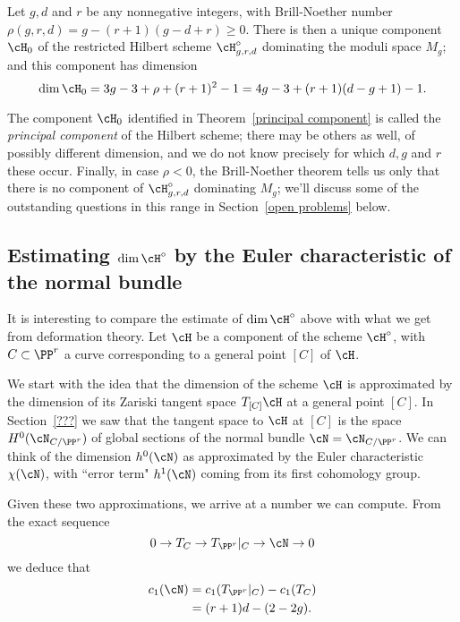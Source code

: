 \begin{theorem}\label{principal component}
Let $g, d$ and $r$ be any nonnegative integers, with Brill-Noether number  $\rho(g,r,d) = g - (r+1)(g-d+r) \geq 0$. There is then a unique component $\cH_0$ of the restricted Hilbert scheme $\cH^\circ_{g,r,d}$ dominating the moduli space $M_g$; and this component has dimension
$$
\dim \cH_0 = 3g-3+\rho + (r+1)^2 - 1 = 4g-3 + (r+1)(d-g+1) - 1.
$$
\end{theorem}

 The component $\cH_0$ identified in Theorem~\ref{principal component} is called the \emph{principal component} of the Hilbert scheme; there may be others as well, of possibly different dimension, and we do not know precisely for which $d,g$ and $r$ these occur. Finally, in case $\rho < 0$, the Brill-Noether theorem tells us only that there is no component of $\cH^\circ_{g,r,d}$ dominating $M_g$; we'll discuss some of the outstanding questions in this range in Section~\ref{open problems} below. 


\subsection{Estimating $\dim \cH^\circ$ by the Euler characteristic of the normal bundle}

It is interesting to compare the estimate of  $\dim \cH^\circ$ above with what we get from deformation theory. Let $\cH$ be a component of the scheme $\cH^\circ$, with $C \subset \PP^r$ a curve corresponding to a general point $[C]$ of $\cH$.

We start with the idea that the dimension of the scheme $\cH$ is approximated by the dimension of its Zariski tangent space $T_{[C]}\cH$ at a general point $[C]$. In Section~\ref{???} we saw that the tangent space to $\cH$ at $[C]$ is the space $H^0(\cN_{C/\PP^r})$ of global sections of the normal bundle $\cN = \cN_{C/\PP^r}$. We can think of the dimension $h^0(\cN)$ as approximated by the Euler characteristic $\chi(\cN)$, with ``error term" $h^1(\cN)$ coming from its first cohomology group.

Given these two approximations, we arrive at a number we can  compute. From the exact sequence
$$
0 \to T_C \to T_{\PP^r}|_C \to \cN \to 0
$$
we deduce that
\begin{align*}
c_1(\cN) &= c_1(T_{\PP^r}|_C) - c_1(T_C) \\
&= (r+1)d - (2-2g).
\end{align*}

